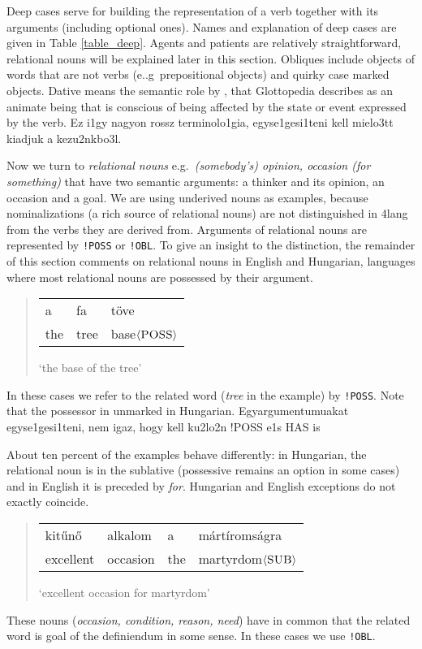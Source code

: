 \documentclass[a4paper,10pt]{article}
\begin{document}
Deep cases serve for building the representation of a verb together with its
arguments (including optional ones). Names and explanation of deep cases are
given in Table \ref{table_deep}.  Agents and patients are relatively
straightforward, relational nouns will be explained later in this
section. Obliques include objects of words that are not verbs
(e..g\ prepositional objects) and quirky case marked objects. {{Dative means
    the semantic role by \cite{Fillmore:1968}, that Glottopedia describes as
    an animate being that is conscious of being affected by the state or event
    expressed by the verb.}} {\color{red} Ez i1gy nagyon rossz terminolo1gia, 
egyse1gesi1teni kell mielo3tt kiadjuk a kezu2nkbo3l.} 

Now we turn to \emph{relational nouns} e.g.\ \emph{(somebody's) opinion,
  occasion (for something)} that have two semantic arguments: a thinker and
its opinion, an occasion and a goal. We are using underived nouns as examples,
because nominalizations (a rich source of relational nouns) are not
distinguished in 4lang from the verbs they are derived from.  Arguments of
relational nouns are represented by \texttt{!POSS} or \texttt{!OBL}. To give
an insight to the distinction, the remainder of this section comments on
relational nouns in English and Hungarian, languages where most {relational
  nouns} are possessed by their argument.
\begin{quote}
 \begin{tabular}{lll}
  a &fa &töve
 \\the &tree &base$\langle\textsc{POSS}\rangle$
 \end{tabular}
 
 `the base of the tree'
\end{quote}
In these cases we refer to the related word (\emph{tree} in the example) by
\texttt{!POSS}. Note that the possessor in unmarked in Hungarian. {\color{red}
  Egyargumentumuakat egyse1gesi1teni, nem igaz, hogy kell ku2lo2n !POSS e1s
  HAS is}
 
About ten percent of the examples behave differently: in Hungarian, the
relational noun is in the sublative (possessive remains an option in some
cases) and in English it is preceded by \emph{for}. Hungarian and English
exceptions do not exactly coincide.
\begin{quote}
 \begin{tabular}{llll}
  kitűnő		& alkalom	& a & mártíromságra
 \\ excellent	& occasion 	& the & martyrdom$\langle\textsc{SUB}\rangle$
 \end{tabular}
 
 `excellent occasion for martyrdom'
\end{quote}
These nouns (\emph{occasion, condition, reason, need}) have in common that the related word is goal of the definiendum in some sense. In these cases we use \texttt{!OBL}.
\end{document}
